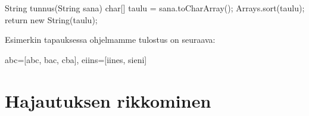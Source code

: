 \begin{code}
String tunnus(String sana) {
    char[] taulu = sana.toCharArray();
    Arrays.sort(taulu);
    return new String(taulu);
}
\end{code}

Esimerkin tapauksessa ohjelmamme tulostus on seuraava:

\begin{code}
{abc=[abc, bac, cba], eiins=[iines, sieni]}
\end{code}

\section{Hajautuksen rikkominen}
